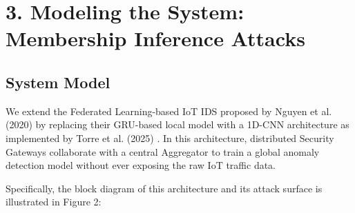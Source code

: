\documentclass[letterpaper]{article}
\begin{document}
\section{3. Modeling the System: Membership Inference Attacks}

\subsection*{System Model}
We extend the Federated Learning-based IoT IDS proposed by Nguyen et al. (2020) \cite{nguyen2020} by replacing their GRU-based local model with a 1D-CNN architecture as implemented by Torre et al. (2025) \cite{torre2025}. In this architecture, distributed Security Gateways collaborate with a central Aggregator to train a global anomaly detection model without ever exposing the raw IoT traffic data.

Specifically, the block diagram of this architecture and its attack surface is illustrated in Figure 2:
\end{document}
